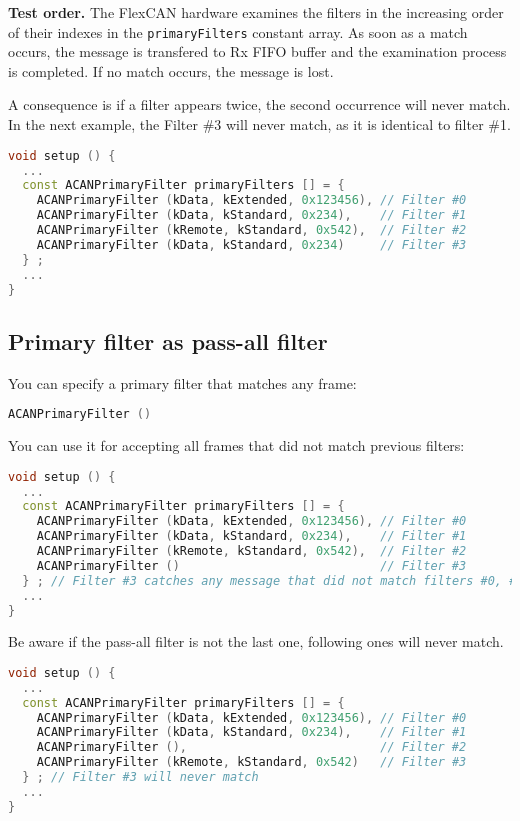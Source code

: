 \documentclass[10pt, a4paper, obeyspaces, openany]{extarticle}
\newcommand \subsectionLabel[2]{\subsection{#1}\label{subsec:#2}}
\begin{document}
{\bf Test order.} The FlexCAN hardware examines the filters in the increasing order of their indexes in the \texttt{primaryFilters} constant array. As soon as a match occurs, the message is transfered to Rx FIFO buffer and the examination process is completed. If no match occurs, the message is lost.

A consequence is if a filter appears twice, the second occurrence will never match. In the next example, the Filter \#3 will never match, as it is identical to filter \#1.

{ \small\begin{lstlisting}[language=c++]
void setup () {
  ...
  const ACANPrimaryFilter primaryFilters [] = {
    ACANPrimaryFilter (kData, kExtended, 0x123456), // Filter #0
    ACANPrimaryFilter (kData, kStandard, 0x234),    // Filter #1
    ACANPrimaryFilter (kRemote, kStandard, 0x542),  // Filter #2
    ACANPrimaryFilter (kData, kStandard, 0x234)     // Filter #3
  } ;
  ...
}
\end{lstlisting}}



\subsectionLabel{Primary filter as pass-all filter}{passAllPrimaryFilter}

You can specify a primary filter that matches any frame: 
{ \small\begin{lstlisting}[language=c++]
    ACANPrimaryFilter ()
\end{lstlisting}}

You can use it for accepting all frames that did not match previous filters:
{ \small\begin{lstlisting}[language=c++]
void setup () {
  ...
  const ACANPrimaryFilter primaryFilters [] = {
    ACANPrimaryFilter (kData, kExtended, 0x123456), // Filter #0
    ACANPrimaryFilter (kData, kStandard, 0x234),    // Filter #1
    ACANPrimaryFilter (kRemote, kStandard, 0x542),  // Filter #2
    ACANPrimaryFilter ()                            // Filter #3
  } ; // Filter #3 catches any message that did not match filters #0, #1 and #2
  ...
}
\end{lstlisting}}

Be aware if the pass-all filter is not the last one, following ones will never match.
{ \small\begin{lstlisting}[language=c++]
void setup () {
  ...
  const ACANPrimaryFilter primaryFilters [] = {
    ACANPrimaryFilter (kData, kExtended, 0x123456), // Filter #0
    ACANPrimaryFilter (kData, kStandard, 0x234),    // Filter #1
    ACANPrimaryFilter (),                           // Filter #2
    ACANPrimaryFilter (kRemote, kStandard, 0x542)   // Filter #3
  } ; // Filter #3 will never match
  ...
}
\end{lstlisting}}
\end{document}

